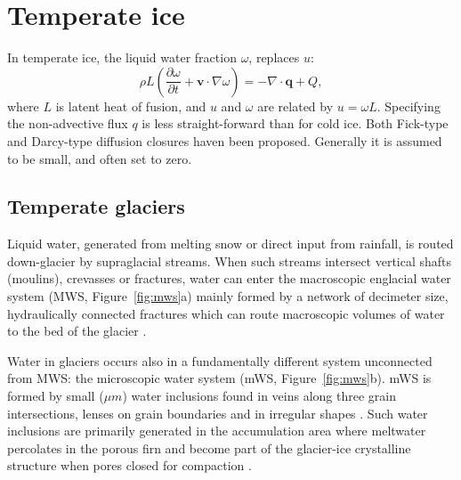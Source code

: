 \documentclass[parskip=half]{scrartcl}
\begin{document}
\section{Temperate ice}
\label{sec:temperate-ice}

In temperate ice, the liquid water fraction $\omega$, replaces $u$:
\begin{equation}
  \label{eq:water-content-equation} \rho L\left(\frac{\partial
\omega}{\partial t} + \mathbf{ v}\cdot\nabla \omega\right) = -\nabla \cdot
\mathbf{q} + Q,
\end{equation} where $L$ is latent heat of fusion, and $u$ and
$\omega$ are related by $u=\omega L$. Specifying the non-advective
flux $q$ is less straight-forward than for cold ice. Both Fick-type
and Darcy-type diffusion closures haven been proposed. Generally it is
assumed to be small, and often set to zero.

\subsection{Temperate glaciers}
\label{sec:temperate-glaciers}

Liquid water, generated from melting snow or direct input from
rainfall, is routed down{-}glacier by supraglacial streams. When such
streams intersect vertical shafts (moulins), crevasses or fractures,
water can enter the macroscopic englacial water system (MWS,
Figure~\ref{fig:mws}a) mainly formed by a network of decimeter size,
hydraulically connected fractures which can route macroscopic volumes
of water to the bed of the glacier
\citep{FountainWalder1998,Fountain2005}.
%

Water in glaciers occurs also in a fundamentally different system
unconnected from MWS: the microscopic water system (mWS,
Figure~\ref{fig:mws}b). mWS is formed by small ($\mu m$) water
inclusions found in veins along three grain intersections, lenses on
grain boundaries and in irregular shapes
\citep{RaymondHarrison1975,Nye1989,Mader1992,FountainWalder1998}. Such
water inclusions are primarily generated in the accumulation area
where meltwater percolates in the porous firn and become part of the
glacier-ice crystalline structure when pores closed for compaction
\citep{Paterson1971,Lliboutry1976,Pettersson2004}.
\end{document}
